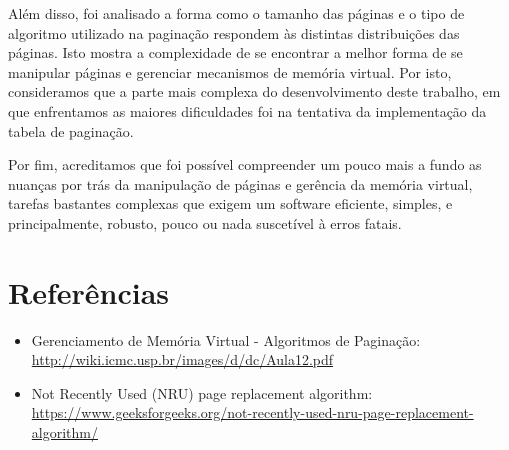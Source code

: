 \documentclass[a4paper, 12pt]{article}
\begin{document}
Além disso, foi analisado a forma como o tamanho das páginas e o tipo de algoritmo utilizado na paginação respondem às distintas distribuições das páginas. Isto mostra a complexidade de se encontrar a melhor forma de se manipular páginas e gerenciar mecanismos de memória virtual. Por isto, consideramos que a parte mais complexa do desenvolvimento deste trabalho, em que enfrentamos as maiores dificuldades foi na tentativa da implementação da tabela de paginação.

Por fim, acreditamos que foi possível compreender um pouco mais a fundo as nuanças por trás da  manipulação de páginas e gerência da memória virtual, tarefas bastantes complexas que exigem um software eficiente, simples, e principalmente, robusto, pouco ou nada suscetível à erros fatais.

\section*{Referências}
\begin{itemize}
    \item Gerenciamento de Memória Virtual - Algoritmos de Paginação: \url{http://wiki.icmc.usp.br/images/d/dc/Aula12.pdf}
    \item Not Recently Used (NRU) page replacement algorithm: \url{https://www.geeksforgeeks.org/not-recently-used-nru-page-replacement-algorithm/}
\end{itemize}
\end{document}
